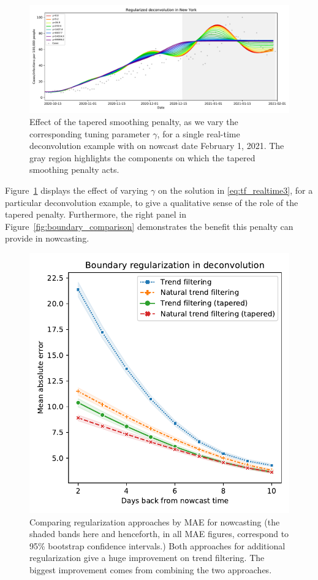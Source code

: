\documentclass[sts]{imsart}
\theoremstyle{plain}
\theoremstyle{definition}
\theoremstyle{remark}
\begin{document}
\begin{figure}[tb]
\centering
\includegraphics[width=0.95\linewidth]{./figures/effect_tapered_ntf.pdf}
\caption{Effect of the tapered smoothing penalty, as we vary the 
corresponding tuning parameter $\gamma$, for a single real-time 
deconvolution example with on nowcast date February 1, 2021. The gray 
region highlights the  components on which the tapered smoothing penalty 
acts.}
\label{fig:tapered_smooth}
\end{figure}

Figure~\ref{fig:tapered_smooth} displays the effect of varying $\gamma$ on the
solution in \eqref{eq:tf_realtime3}, for a particular deconvolution example, to
give a qualitative sense of the role of the tapered penalty. Furthermore, the
right panel in Figure~\ref{fig:boundary_comparison} demonstrates the benefit
this penalty can provide in nowcasting.

\begin{figure}[tb]
\centering
\includegraphics[width=0.825\linewidth]{./figures/tapered_smoothing_03_small_square.pdf}
\caption{Comparing regularization approaches by MAE for nowcasting (the shaded
  bands here and henceforth, in all MAE figures, correspond to 95\% bootstrap
  confidence intervals.) Both approaches for additional regularization give a
  huge improvement on trend filtering. The biggest improvement comes from
  combining the two approaches.}
	\label{fig:extra_reg}
\end{figure}
\end{document}

